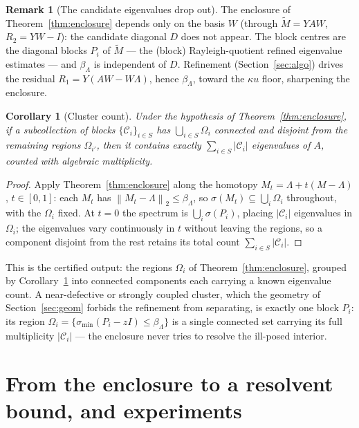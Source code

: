 \documentclass[11pt,a4paper]{article}
\newcommand{\norm}[1]{\left\|#1\right\|}
\newcommand{\abs}[1]{\left|#1\right|}
\newcommand{\spec}{\sigma}
\theoremstyle{plain}
\newtheorem{corollary}[theorem]{Corollary}
\theoremstyle{definition}
\newtheorem{remark}[theorem]{Remark}
\begin{document}
\begin{remark}[The candidate eigenvalues drop out]\label{rem:Dfree}
The enclosure of Theorem~\ref{thm:enclosure} depends only on the basis $W$ (through
$\widetilde M=YAW$, $R_2=YW-I$): the candidate diagonal $D$ does not appear. The block
centres are the diagonal blocks $P_i$ of $\widetilde M$ --- the (block) Rayleigh-quotient
refined eigenvalue estimates --- and $\beta_\Lambda$ is independent of $D$. Refinement
(Section~\ref{sec:algo}) drives the residual $R_1=Y(AW-W\Lambda)$, hence $\beta_\Lambda$,
toward the $\kappa u$ floor, sharpening the enclosure.
\end{remark}

\begin{corollary}[Cluster count]\label{cor:clusters}
Under the hypothesis of Theorem~\ref{thm:enclosure}, if a subcollection of blocks
$\{\mathcal C_i\}_{i\in S}$ has $\bigcup_{i\in S}\Omega_i$ connected and disjoint from the
remaining regions $\Omega_{i'}$, then it contains exactly $\sum_{i\in S}\abs{\mathcal C_i}$
eigenvalues of $A$, counted with algebraic multiplicity.
\end{corollary}

\begin{proof}
Apply Theorem~\ref{thm:enclosure} along the homotopy $M_t=\Lambda+t(M-\Lambda)$,
$t\in[0,1]$: each $M_t$ has $\norm{M_t-\Lambda}_2\le\beta_\Lambda$, so $\spec(M_t)\subseteq\bigcup_i\Omega_i$
throughout, with the $\Omega_i$ fixed. At $t=0$ the spectrum is $\bigcup_i\spec(P_i)$,
placing $\abs{\mathcal C_i}$ eigenvalues in $\Omega_i$; the eigenvalues vary continuously in
$t$ without leaving the regions, so a component disjoint from the rest retains its total
count $\sum_{i\in S}\abs{\mathcal C_i}$.
\end{proof}

This is the certified output: the regions $\Omega_i$ of Theorem~\ref{thm:enclosure},
grouped by Corollary~\ref{cor:clusters} into connected components each carrying a known
eigenvalue count. A near-defective or strongly coupled cluster, which the geometry of
Section~\ref{sec:geom} forbids the refinement from separating, is exactly one block $P_i$:
its region $\Omega_i=\{\sigma_{\min}(P_i-zI)\le\beta_\Lambda\}$ is a single connected set carrying
its full multiplicity $\abs{\mathcal C_i}$ --- the enclosure never tries to resolve the
ill-posed interior.

\section{From the enclosure to a resolvent bound, and experiments}\label{sec:resolvent}
\end{document}
